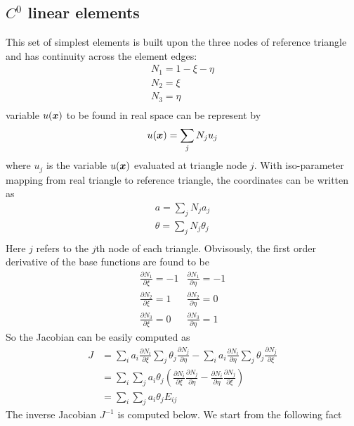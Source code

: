\documentclass{report}
\newcommand{\bm}[1]{\mbox{\boldmath $#1$}}
\newcommand{\pp}[2]{\frac{\partial{#1}}{\partial{#2}}}
\begin{document}
\subsection{$C^0$ linear elements}
\label{sec:e1}
This set of simplest elements is built upon the three nodes of reference triangle and 
has continuity across the element edges:
\begin{equation}
\begin{array}{l}
N_1 = 1-\xi-\eta\\
N_2=\xi\\
N_3=\eta\\
\end{array}
\end{equation}
variable $u(\bm{x})$ to be found in real space can be represent by
\begin{equation}
u(\bm{x})=\sum_j N_j u_j
\end{equation}
where $u_j$ is the variable $u(\bm{x})$ evaluated at triangle node $j$.
With iso-parameter mapping from real triangle to reference triangle,
the coordinates can be written as
\begin{equation}
\begin{array}{l}
a=\sum_j N_j a_j\\
\theta=\sum_j N_j \theta_j\\
\end{array}
\end{equation}
Here $j$ refers to the $j$th node of each triangle. 
Obvisously, the first order derivative of the base functions are found to be
\begin{equation}
\begin{array}{ll}
\pp{N_1}{\xi} = -1   &  \pp{N_1}{\eta} = -1\\
\pp{N_2}{\xi} = 1    &  \pp{N_2}{\eta} = 0\\
\pp{N_3}{\xi} = 0    &  \pp{N_3}{\eta} = 1
\end{array}
\end{equation}
So the Jacobian can be easily computed as 
$$
\begin{array}{ll}
J & = \sum_i a_i \pp{N_i}{\xi}  \sum_j \theta_j \pp{N_j}{\eta} - 
      \sum_i a_i \pp{N_i}{\eta} \sum_j \theta_j \pp{N_j}{\xi}
\\
  & = \sum_i\sum_j a_i  \theta_j \left(\pp{N_i}{\xi}  \pp{N_j}{\eta} - \pp{N_i}{\eta} \pp{N_j}{\xi}\right)
\\
  & = \sum_i\sum_j a_i  \theta_j E_{ij}
\end{array}
$$
The inverse Jacobian $J^{-1}$ is computed below.
We start from the following fact
\end{document}
